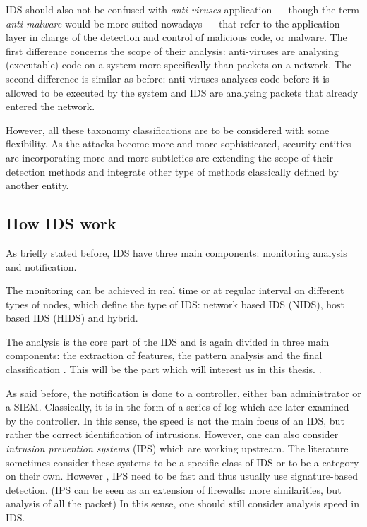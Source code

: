 IDS should also not be confused with \emph{anti-viruses} application --- though the term \emph{anti-malware} would be more suited nowadays --- that refer to the application layer in charge of the detection and control of malicious code, or malware. The first difference concerns the scope of their analysis: anti-viruses are analysing (executable) code on a system more specifically than packets on a network. The second difference is similar as before: anti-viruses analyses code before it is allowed to be executed by the system and IDS are analysing packets that already entered the network.

However, all these taxonomy classifications are to be considered with some flexibility. As the attacks become more and more sophisticated, security entities are incorporating more and more subtleties are extending the scope of their detection methods and integrate other type of methods classically defined by another entity. 

\subsection{How IDS work}
As briefly stated before, IDS have three main components: monitoring analysis and notification. 

The monitoring can be achieved in real time or at regular interval on different types of nodes, which define the type of IDS: network based IDS (NIDS), host based IDS (HIDS) and hybrid. 

The analysis is the core part of the IDS and is again divided in three main components: the extraction of features, the pattern analysis and the final classification \cite{Winter2018}. This will be the part which will interest us in this thesis. .

As said before, the notification is done to a controller, either ban administrator or a SIEM. Classically, it is in the form of a series of log which are later examined by the controller. In this sense, the speed is not the main focus of an IDS, but rather the correct identification of intrusions. However, one can also consider \emph{intrusion prevention systems} (IPS) which are working upstream. The literature sometimes consider these systems to be a specific class of IDS or to be a category on their own. However , IPS need to be fast and thus usually use signature-based detection. (IPS can be seen as an extension of firewalls: more similarities, but analysis of all the packet) In this sense, one should still consider analysis speed in IDS.

